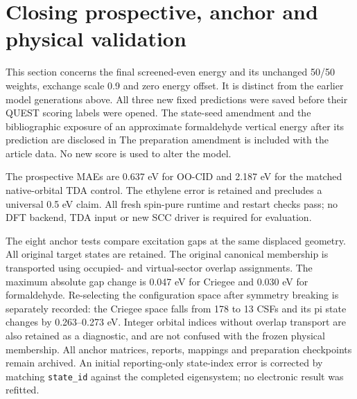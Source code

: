 \documentclass[11pt,a4paper]{article}
\begin{document}
\section{Closing prospective, anchor and physical validation}
This section concerns the final screened-even energy and its unchanged
50/50 weights, exchange scale 0.9 and zero energy offset. It is distinct
from the earlier model generations above. All three new fixed predictions
were saved before their QUEST scoring labels were opened. The state-seed
amendment and the bibliographic exposure of an approximate formaldehyde
vertical energy after its prediction are disclosed in
The preparation amendment is included with the article data. No new score is
used to alter the model.
\begin{center}\small\end{center}
The prospective MAEs are 0.637 eV for OO-CID and 2.187 eV for the matched
native-orbital TDA control. The ethylene error is retained and precludes a
universal 0.5 eV claim. All fresh spin-pure runtime and restart checks pass;
no DFT backend, TDA input or new SCC driver is required for evaluation.

The eight anchor tests compare excitation gaps at the same displaced
geometry. All original target states are retained. The original canonical
membership is transported using occupied- and virtual-sector overlap
assignments. The maximum absolute gap change is 0.047 eV for Criegee and
0.030 eV for formaldehyde. Re-selecting the configuration space after
symmetry breaking is separately recorded: the Criegee space falls from
178 to 13 CSFs and its pi state changes by 0.263--0.273 eV. Integer orbital
indices without overlap transport are also retained as a diagnostic, and
are not confused with the frozen physical membership. All anchor matrices,
reports, mappings and preparation checkpoints remain archived. An initial
reporting-only state-index error is corrected by matching \texttt{state\_id}
against the completed eigensystem; no electronic result was refitted.
\end{document}
